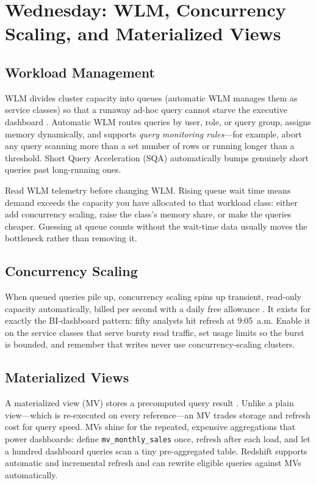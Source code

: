 \section{Wednesday: WLM, Concurrency Scaling, and Materialized Views}
\subsection{Workload Management}
WLM divides cluster capacity into queues (automatic WLM manages them as service classes) so that a runaway ad-hoc query cannot starve the executive dashboard \cite{awsRedshiftWLM}. Automatic WLM routes queries by user, role, or query group, assigns memory dynamically, and supports \emph{query monitoring rules}---for example, abort any query scanning more than a set number of rows or running longer than a threshold. Short Query Acceleration (SQA) automatically bumps genuinely short queries past long-running ones.

\begin{tipbox}
Read WLM telemetry before changing WLM. Rising queue wait time means demand exceeds the capacity you have allocated to that workload class: either add concurrency scaling, raise the class's memory share, or make the queries cheaper. Guessing at queue counts without the wait-time data usually moves the bottleneck rather than removing it.
\end{tipbox}

\subsection{Concurrency Scaling}
When queued queries pile up, concurrency scaling spins up transient, read-only capacity automatically, billed per second with a daily free allowance \cite{awsRedshiftWLM}. It exists for exactly the BI-dashboard pattern: fifty analysts hit refresh at 9:05~a.m. Enable it on the service classes that serve bursty read traffic, set usage limits so the burst is bounded, and remember that writes never use concurrency-scaling clusters.

\subsection{Materialized Views}
A materialized view (MV) stores a precomputed query result \cite{awsRedshiftMVs}. Unlike a plain view---which is re-executed on every reference---an MV trades storage and refresh cost for query speed. MVs shine for the repeated, expensive aggregations that power dashboards: define \texttt{mv\_monthly\_sales} once, refresh after each load, and let a hundred dashboard queries scan a tiny pre-aggregated table. Redshift supports automatic and incremental refresh and can rewrite eligible queries against MVs automatically.

